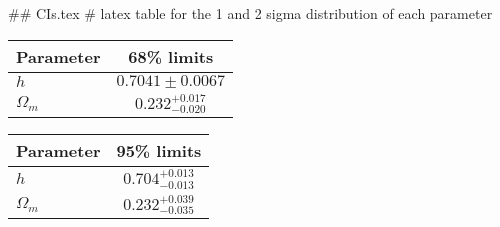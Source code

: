 ## CIs.tex
# latex table for the 1 and 2 sigma distribution of each parameter

\begin{tabular} { l  c}
 Parameter &  68\% limits\\
\hline
{\boldmath$h              $} & $0.7041\pm 0.0067          $\\
{\boldmath$\Omega_m       $} & $0.232^{+0.017}_{-0.020}   $\\
\hline
\end{tabular}

\begin{tabular} { l  c}
 Parameter &  95\% limits\\
\hline
{\boldmath$h              $} & $0.704^{+0.013}_{-0.013}   $\\
{\boldmath$\Omega_m       $} & $0.232^{+0.039}_{-0.035}   $\\
\hline
\end{tabular}

